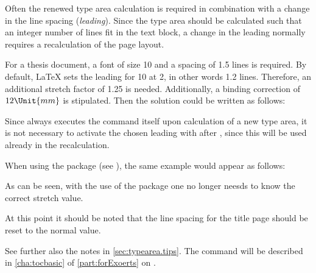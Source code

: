 Often the renewed type area calculation is required in combination
with a change in the line spacing
(\emph{leading}). Since the type area should be
calculated such that an integer number of lines fit in the text block,
a change in the leading normally requires a recalculation of the page
layout.
 
\begin{Example}
  For a thesis document, a font of size 10 and a spacing of
  1.5 lines is required. By default, {\LaTeX} sets the leading for
  10 at 2, in other words 1.2 lines. Therefore, an
  additional stretch factor of 1.25 is needed. Additionally, a binding
  correction of \(12\Unit{mm}\) is stipulated. Then the solution could be
  written as follows:
Since  always executes the command
 itself upon calculation of a new type area, it is
not necessary to activate the chosen leading with 
after , since this will be used already in the
recalculation.

When using the  package (see
\cite{package:setspace}), the same example would appear as follows:
As can be seen, with the use of the  package one no
longer neesds to know the correct stretch value.

At this point it should be noted that the line spacing for the title
page should be reset to the normal value.
\iffalse%
  A complete example would be:
\fi
{}
  See further also the notes in \autoref{sec:typearea.tips}. The command
   will be described in
  \autoref{cha:tocbasic} of \autoref{part:forExoerts} on
  .
\end{Example}

